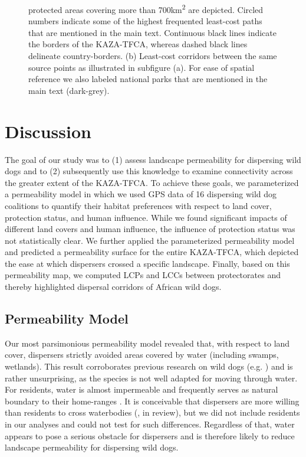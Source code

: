 \documentclass[abstract=on,10pt,a4paper,bibliography=totocnumbered]{scrartcl}
\begin{document}
\begin{figure}[hbtp]
\begin{center}
{    protected areas covering more than 700km\textsuperscript{2} are depicted.
    Circled numbers indicate some of the highest frequented least-cost paths
    that are mentioned in the main text. Continuous black lines indicate the
    borders of the KAZA-TFCA, whereas dashed black lines delineate
    country-borders. (b) Least-cost corridors between the same source points as
    illustrated in subfigure (a). For ease of spatial reference we also labeled
    national parks that are mentioned in the main text (dark-grey).}
    \label{LeastCost}
  \end{center}
\end{figure}
\restoregeometry

\newpage
\section{Discussion}
The goal of our study was to (1) assess landscape permeability for dispersing
wild dogs and to (2) subsequently use this knowledge to examine connectivity
across the greater extent of the KAZA-TFCA. To achieve these goals, we
parameterized a permeability model in which we used GPS data of 16 dispersing
wild dog coalitions to quantify their habitat preferences with respect to land
cover, protection status, and human influence. While we found significant
impacts of different land covers and human influence, the influence of
protection status was not statistically clear. We further applied the
parameterized permeability model and predicted a permeability surface for the
entire KAZA-TFCA, which depicted the ease at which dispersers crossed a specific
landscape. Finally, based on this permeability map, we computed LCPs and LCCs
between protectorates and thereby highlighted dispersal corridors of African
wild dogs.

\subsection{Permeability Model}
Our most parsimonious permeability model revealed that, with respect to land
cover, dispersers strictly avoided areas covered by water (including swamps,
wetlands). This result corroborates previous research on wild dogs (e.g.
\cite{Abrahms.2017}) and is rather unsurprising, as the species is not well
adapted for moving through water. For residents, water is almost impermeable and
frequently serves as natural boundary to their home-ranges \citep{Cozzi.2013}.
It is conceivable that dispersers are more willing than residents to cross
waterbodies (\citeauthor{Cozzi.2019}, in review), but we did not include
residents in our analyses and could not test for such differences. Regardless of
that, water appears to pose a serious obstacle for dispersers and is therefore
likely to reduce landscape permeability for dispersing wild dogs.
\end{document}
